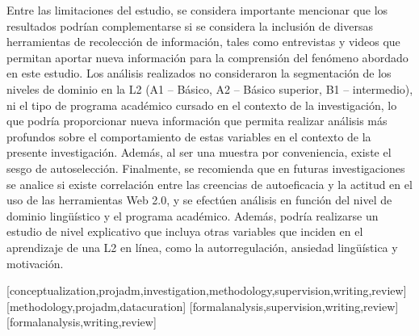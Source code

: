 \documentclass[spanish]{textolivre}
\begin{document}
Entre las limitaciones del estudio, se considera importante mencionar que los resultados podrían complementarse si se considera la inclusión de diversas herramientas de recolección de información, tales como entrevistas y videos que permitan aportar nueva información para la comprensión del fenómeno abordado en este estudio. Los análisis realizados no consideraron la segmentación de los niveles de dominio en la L2 (A1 – Básico, A2 – Básico superior, B1 – intermedio), ni el tipo de programa académico cursado en el contexto de la investigación, lo que podría proporcionar nueva información que permita realizar análisis más profundos sobre el comportamiento de estas variables en el contexto de la presente investigación. Además, al ser una muestra por conveniencia, existe el sesgo de autoselección. Finalmente, se recomienda que en futuras investigaciones se analice si existe correlación entre las creencias de autoeficacia y la actitud en el uso de las herramientas Web 2.0, y se efectúen análisis en función del nivel de dominio lingüístico y el programa académico. Además, podría realizarse un estudio de nivel explicativo que incluya otras variables que inciden en el aprendizaje de una L2 en línea, como la autorregulación, ansiedad lingüística y motivación.



\printbibliography\label{sec-bib}
\begin{contributors}
[conceptualization,projadm,investigation,methodology,supervision,writing,review]
[methodology,projadm,datacuration]
[formalanalysis,supervision,writing,review]
[formalanalysis,writing,review]
\end{contributors}
\end{document}
